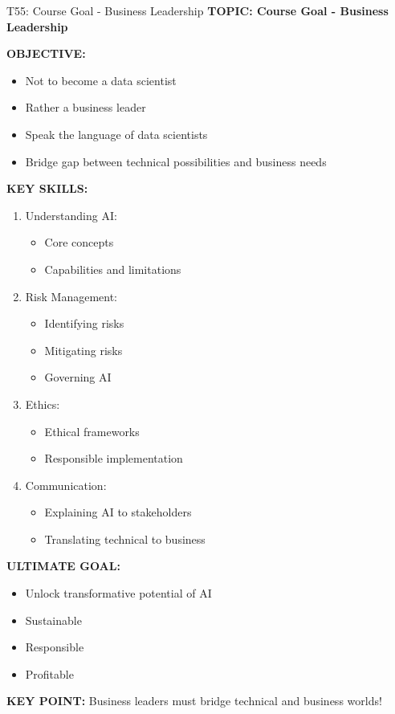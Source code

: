 \documentclass[8pt]{beamer}
\begin{document}
	\begin{frame}{T55: Course Goal - Business Leadership}
		\fontsize{6.5}{7.5}\selectfont
		\textbf{TOPIC: Course Goal - Business Leadership}
		
		\vspace{0.1cm}
		\textbf{OBJECTIVE:}
		\begin{itemize}
			\item Not to become a data scientist
			\item Rather a business leader
			\item Speak the language of data scientists
			\item Bridge gap between technical possibilities and business needs
		\end{itemize}
		
		\vspace{0.1cm}
		\textbf{KEY SKILLS:}
		\begin{enumerate}
			\item \textcolor{myblue}{Understanding AI:}
			\begin{itemize}
				\item Core concepts
				\item Capabilities and limitations
			\end{itemize}
			\item \textcolor{myblue}{Risk Management:}
			\begin{itemize}
				\item Identifying risks
				\item Mitigating risks
				\item Governing AI
			\end{itemize}
			\item \textcolor{myblue}{Ethics:}
			\begin{itemize}
				\item Ethical frameworks
				\item Responsible implementation
			\end{itemize}
			\item \textcolor{myblue}{Communication:}
			\begin{itemize}
				\item Explaining AI to stakeholders
				\item Translating technical to business
			\end{itemize}
		\end{enumerate}
		
		\vspace{0.1cm}
		\textbf{ULTIMATE GOAL:}
		\begin{itemize}
			\item Unlock transformative potential of AI
			\item Sustainable
			\item Responsible
			\item Profitable
		\end{itemize}
		
		\textcolor{myred}{\textbf{KEY POINT:}} Business leaders must \textcolor{myblue}{bridge technical and business worlds}!
	\end{frame}
	
\end{document}
